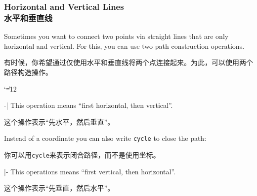 \subsubsection{Horizontal and Vertical Lines\\水平和垂直线}

Sometimes you want to connect two points via straight lines that are only
horizontal and vertical. For this, you can use two path construction
operations.

有时候，你希望通过仅使用水平和垂直线将两个点连接起来。为此，可以使用两个路径构造操作。



{\catcode`\|=12
\begin{pathoperation}[noindex]{-|}{}
    \pgfmanualpdflabel[\catcode`\|=12 ]{-|}{}%
    This operation means ``first horizontal, then vertical''.
    
    
    这个操作表示“先水平，然后垂直”。
%
\begin{codeexample}[]
\end{codeexample}
    Instead of a coordinate you can also write \verb!cycle! to close the path:

    你可以用\verb!cycle!来表示闭合路径，而不是使用坐标。



\begin{codeexample}[]
\end{codeexample}
\end{pathoperation}

\begin{pathoperation}[noindex]{|-}{}
    \pgfmanualpdflabel[\catcode`\|=12 ]{|-}{}%
    This operations means ``first vertical, then horizontal''.

    这个操作表示“先垂直，然后水平”。
\end{pathoperation}
}


